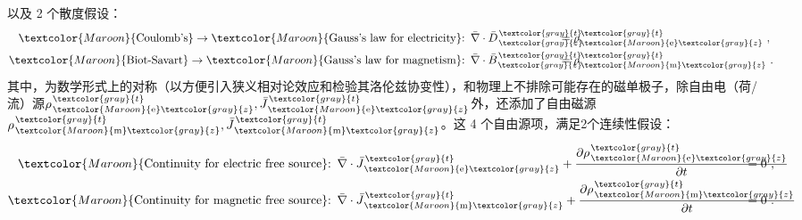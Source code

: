 以及 2 个散度假设：
\begin{subequations} \label{eq:maxwell-db}
\begin{align}
	\textcolor{Maroon}{\text{Coulomb's}} \to \textcolor{Maroon}{\text{Gauss's law for electricity}}\text{:}&\hspace{0.5em} \bar{\nabla} \cdot \bar{D}^{\;\!\textcolor{gray}{t}}_{\;\!\textcolor{gray}{z}} \hspace{-3.2em} &&= {\rho}^{\;\!\textcolor{gray}{t}}_{\;\!\textcolor{Maroon}{\text{e}}\textcolor{gray}{z}}~, \label{eq:maxwell-d} \\ \textcolor{Maroon}{\text{Biot-Savart}} \to \textcolor{Maroon}{\text{Gauss's law for magnetism}}\text{:}&\hspace{0.5em} \bar{\nabla} \cdot \bar{B}^{\;\!\textcolor{gray}{t}}_{\;\!\textcolor{gray}{z}} \hspace{-3.2em} &&= {\rho}^{\;\!\textcolor{gray}{t}}_{\;\!\textcolor{Maroon}{\text{m}}\textcolor{gray}{z}}~. \label{eq:maxwell-b}
\end{align}
\end{subequations}
其中，为数学形式上的对称（以方便引入狭义相对论效应和检验其洛伦兹协变性\cite{lakhtakiaCovariancesInvariancesMaxwell1995,chen-zhuChenZhuxieUndergraduate_courses2024}），和物理上不排除可能存在的磁单极子，除自由电（荷/流）源${\rho}^{\;\!\textcolor{gray}{t}}_{\;\!\textcolor{Maroon}{\text{e}}\textcolor{gray}{z}}, \bar{J}^{\;\!\textcolor{gray}{t}}_{\;\!\textcolor{Maroon}{\text{e}}\textcolor{gray}{z}}$外，还添加了自由磁源${\rho}^{\;\!\textcolor{gray}{t}}_{\;\!\textcolor{Maroon}{\text{m}}\textcolor{gray}{z}}, \bar{J}^{\;\!\textcolor{gray}{t}}_{\;\!\textcolor{Maroon}{\text{m}}\textcolor{gray}{z}}$\cite{lakhtakiaCovariancesInvariancesMaxwell1995}。这 4 个自由源项，满足2个连续性假设\cite{mackayElectromagneticAnisotropyBianisotropy2019,lakhtakiaCovariancesInvariancesMaxwell1995,chen-zhuChenZhuxieUndergraduate_courses2024}：
\begin{subequations} \label{eq:continuity-pj}
\begin{align}
	\textcolor{Maroon}{\text{Continuity for electric free source}}\text{:}&\hspace{0.5em} \bar{\nabla} \cdot \bar{J}^{\;\!\textcolor{gray}{t}}_{\;\!\textcolor{Maroon}{\text{e}}\textcolor{gray}{z}} + \frac{\partial {\rho}^{\;\!\textcolor{gray}{t}}_{\;\!\textcolor{Maroon}{\text{e}}\textcolor{gray}{z}}}{\partial t} \hspace{-5.2em} &&= 0~, \label{eq:continuity-e} \\ \textcolor{Maroon}{\text{Continuity for magnetic free source}}\text{:}&\hspace{0.5em} \bar{\nabla} \cdot \bar{J}^{\;\!\textcolor{gray}{t}}_{\;\!\textcolor{Maroon}{\text{m}}\textcolor{gray}{z}} + \frac{\partial {\rho}^{\;\!\textcolor{gray}{t}}_{\;\!\textcolor{Maroon}{\text{m}}\textcolor{gray}{z}}}{\partial t} \hspace{-5.2em} &&= 0~. \label{eq:continuity-m}
\end{align}
\end{subequations}
